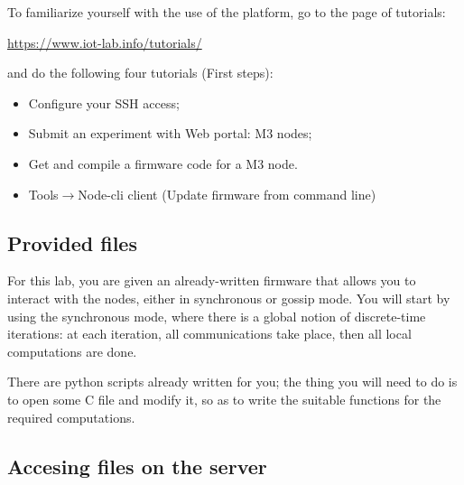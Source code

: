 \documentclass{article}
\begin{document}
To familiarize yourself with the use of the platform, go to the page of tutorials:
\begin{center} \url{https://www.iot-lab.info/tutorials/} \end{center}
and do the following four tutorials (First steps):
\begin{itemize}
\item Configure your SSH access;
\item Submit an experiment with Web portal: M3 nodes;
\item Get and compile a firmware code for a M3 node.
\item Tools$\to$Node-cli client (Update firmware from command line)
\end{itemize}

\subsection{Provided files}

For this lab, you are given
an already-written firmware that allows you to interact with the nodes, either in synchronous or gossip mode. You will start by using the synchronous mode, where  there is a global notion of discrete-time iterations: at each iteration, all communications take place, then all local computations are done.



There are python scripts already written for you; the thing you will need to do
is to open some C file and modify it, so as to write the suitable functions for
the required computations.

\subsection{Accesing files on the server}
\end{document}

